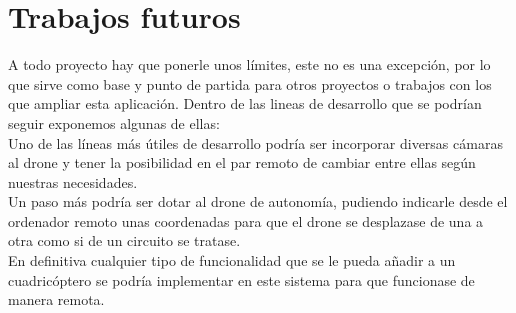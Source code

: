 \section{Trabajos futuros}

A todo proyecto hay que ponerle unos límites, este no es una excepción, por lo que sirve como base y punto de partida para otros proyectos o trabajos con los que ampliar esta aplicación. Dentro de las lineas de desarrollo que se podrían seguir exponemos algunas de ellas:\\

Uno de las líneas más útiles de desarrollo podría ser incorporar diversas cámaras al drone y tener la posibilidad en el par remoto de cambiar entre ellas según nuestras necesidades.\\

Un paso más podría ser dotar al drone de autonomía, pudiendo indicarle desde el ordenador remoto unas coordenadas para que el drone se desplazase de una a otra como si de un circuito se tratase.\\

En definitiva cualquier tipo de funcionalidad que se le pueda añadir a un cuadricóptero se podría implementar en este sistema para que funcionase de manera remota.\\

